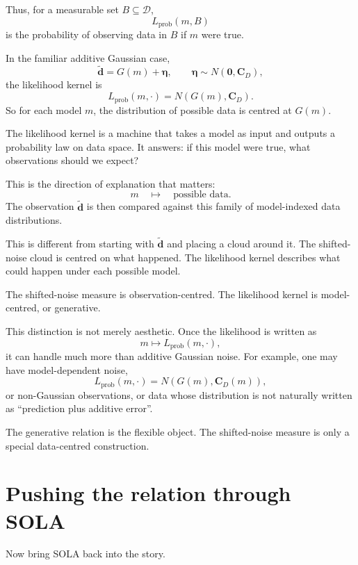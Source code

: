 \documentclass[11pt,openany]{book}
\theoremstyle{definition}
\theoremstyle{remark}
\newcommand{\D}{\mathcal D}
\begin{document}
Thus, for a measurable set \(B\subseteq\D\),
\[
  L_{\mathrm{prob}}(m,B)
\]
is the probability of observing data in \(B\) if \(m\) were true.

In the familiar additive Gaussian case,
\[
  \widetilde{\mathbf d}
  =
  G(m)+\boldsymbol\eta,
  \qquad
  \boldsymbol\eta\sim N(\mathbf 0,\mathbf C_D),
\]
the likelihood kernel is
\[
  L_{\mathrm{prob}}(m,\cdot)
  =
  N(G(m),\mathbf C_D).
\]
So for each model \(m\), the distribution of possible data is centred at \(G(m)\).

\begin{intuitionbox}
The likelihood kernel is a machine that takes a model as input and outputs a probability law on
data space. It answers: if this model were true, what observations should we expect?
\end{intuitionbox}

This is the direction of explanation that matters:
\[
  m
  \quad\longmapsto\quad
  \text{possible data}.
\]
The observation \(\widetilde{\mathbf d}\) is then compared against this family of model-indexed
data distributions.

This is different from starting with \(\widetilde{\mathbf d}\) and placing a cloud around it. The
shifted-noise cloud is centred on what happened. The likelihood kernel describes what could
happen under each possible model.

\begin{checkpointbox}
The shifted-noise measure is observation-centred. The likelihood kernel is model-centred, or
generative.
\end{checkpointbox}

This distinction is not merely aesthetic. Once the likelihood is written as
\[
  m\mapsto L_{\mathrm{prob}}(m,\cdot),
\]
it can handle much more than additive Gaussian noise. For example, one may have
model-dependent noise,
\[
  L_{\mathrm{prob}}(m,\cdot)
  =
  N(G(m),\mathbf C_D(m)),
\]
or non-Gaussian observations, or data whose distribution is not naturally written as
``prediction plus additive error''.

The generative relation is the flexible object. The shifted-noise measure is only a special
data-centred construction.

\section{Pushing the relation through SOLA}

Now bring SOLA back into the story.
\end{document}
